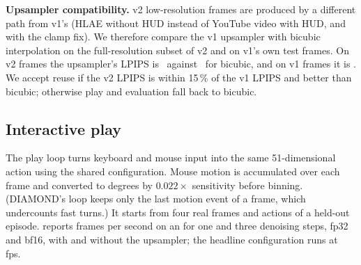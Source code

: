 \textbf{Upsampler compatibility.}
v2 low-resolution frames are produced by a different path from v1's (HLAE without HUD instead of YouTube video with HUD, and with the clamp fix).
We therefore compare the v1 upsampler with bicubic interpolation on the full-resolution subset of v2 and on v1's own test frames.
On v2 frames the upsampler's LPIPS is \TBDupsVtwo\ against \TBDupsBicubic\ for bicubic, and on v1 frames it is \TBDupsVone.
We accept reuse if the v2 LPIPS is within 15\,\% of the v1 LPIPS and better than bicubic; otherwise play and evaluation fall back to bicubic.

\subsection{Interactive play}
\label{sec:play}
The play loop turns keyboard and mouse input into the same 51-dimensional action using the shared configuration.
Mouse motion is accumulated over each frame and converted to degrees by $0.022\times$ sensitivity before binning.
(DIAMOND's loop keeps only the last motion event of a frame, which undercounts fast turns.)
It starts from four real frames and actions of a held-out episode.
 reports frames per second on an \TBDfpsgpu for one and three denoising steps, fp32 and bf16, with and without the upsampler; the headline configuration runs at \TBDfps\,fps.

\begin{table}[t]
  \centering\small
  \caption{Play frame rate on an RTX 3060.}
  \label{tab:fps}
\end{table}
